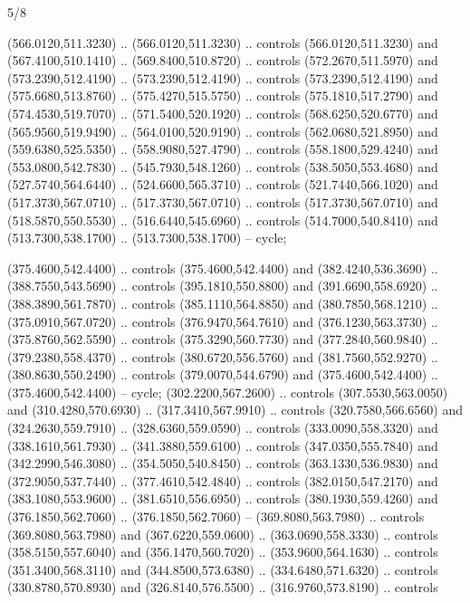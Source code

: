\begin{flagdescription}{5/8}
\begin{scope}[shift={(m)}]
\begin{scope}[scale=\flagwidth/220,y=0.1mm, x=0.1mm, yscale=-1,shift={(-596,-360)}]
\begin{scope}[draw=black,line join=round,line cap=round,line width=0.381\lw]
\begin{scope}[fill=white,line width=1.143\lw]
  (566.0120,511.3230) .. (566.0120,511.3230) .. controls (566.0120,511.3230) and
  (567.4100,510.1410) .. (569.8400,510.8720) .. controls (572.2670,511.5970) and
  (573.2390,512.4190) .. (573.2390,512.4190) .. controls (573.2390,512.4190) and
  (575.6680,513.8760) .. (575.4270,515.5750) .. controls (575.1810,517.2790) and
  (574.4530,519.7070) .. (571.5400,520.1920) .. controls (568.6250,520.6770) and
  (565.9560,519.9490) .. (564.0100,520.9190) .. controls (562.0680,521.8950) and
  (559.6380,525.5350) .. (558.9080,527.4790) .. controls (558.1800,529.4240) and
  (553.0800,542.7830) .. (545.7930,548.1260) .. controls (538.5050,553.4680) and
  (527.5740,564.6440) .. (524.6600,565.3710) .. controls (521.7440,566.1020) and
  (517.3730,567.0710) .. (517.3730,567.0710) .. controls (517.3730,567.0710) and
  (518.5870,550.5530) .. (516.6440,545.6960) .. controls (514.7000,540.8410) and
  (513.7300,538.1700) .. (513.7300,538.1700) -- cycle;
\end{scope}
\begin{scope}[line width=0.534\lw,fill=green]
 (375.4600,542.4400) .. controls (375.4600,542.4400) and
  (382.4240,536.3690) .. (388.7550,543.5690) .. controls (395.1810,550.8800) and
  (391.6690,558.6920) .. (388.3890,561.7870) .. controls (385.1110,564.8850) and
  (380.7850,568.1210) .. (375.0910,567.0720) .. controls (376.9470,564.7610) and
  (376.1230,563.3730) .. (375.8760,562.5590) .. controls (375.3290,560.7730) and
  (377.2840,560.9840) .. (379.2380,558.4370) .. controls (380.6720,556.5760) and
  (381.7560,552.9270) .. (380.8630,550.2490) .. controls (379.0070,544.6790) and
  (375.4600,542.4400) .. (375.4600,542.4400) -- cycle;
 (302.2200,567.2600) .. controls (307.5530,563.0050) and
  (310.4280,570.6930) .. (317.3410,567.9910) .. controls (320.7580,566.6560) and
  (324.2630,559.7910) .. (328.6360,559.0590) .. controls (333.0090,558.3320) and
  (338.1610,561.7930) .. (341.3880,559.6100) .. controls (347.0350,555.7840) and
  (342.2990,546.3080) .. (354.5050,540.8450) .. controls (363.1330,536.9830) and
  (372.9050,537.7440) .. (377.4610,542.4840) .. controls (382.0150,547.2170) and
  (383.1080,553.9600) .. (381.6510,556.6950) .. controls (380.1930,559.4260) and
  (376.1850,562.7060) .. (376.1850,562.7060) -- (369.8080,563.7980) .. controls
  (369.8080,563.7980) and (367.6220,559.0600) .. (363.0690,558.3330) .. controls
  (358.5150,557.6040) and (356.1470,560.7020) .. (353.9600,564.1630) .. controls
  (351.3400,568.3110) and (344.8500,573.6380) .. (334.6480,571.6320) .. controls
  (330.8780,570.8930) and (326.8140,576.5500) .. (316.9760,573.8190) .. controls

\end{scope}
\end{scope}
\end{scope}
\end{scope}
\end{flagdescription}
